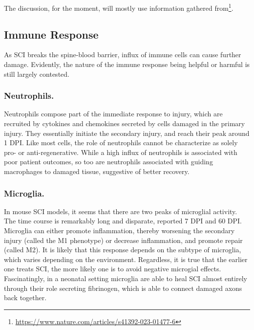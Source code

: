 \documentclass[12pt]{report}
\begin{document}
\label{sec:Cell-Specific-Responses}

The discussion, for the moment, will mostly use information gathered from\footnote{\url{https://www.nature.com/articles/s41392-023-01477-6}}.


\subsection{Immune Response}
As SCI breaks the spine-blood barrier, influx of immune cells can cause further damage. Evidently, the nature of the immune response being helpful or harmful is still largely contested.

\subsubsection{Neutrophils.}
Neutrophils compose part of the immediate response to injury, which are recruited by cytokines and chemokines secreted by cells damaged in the primary injury. They essentially initiate the secondary injury, and reach their peak around 1 DPI. Like most cells, the role of neutrophils cannot be characterize as solely pro- or anti-regenerative. While a high influx of neutrophils is associated with poor patient outcomes, so too are neutrophils associated with guiding macrophages to damaged tissue, suggestive of better recovery. 

\subsubsection{Microglia.}
In mouse SCI models, it seems that there are two peaks of microglial activity. The time course is remarkably long and disparate, reported 7 DPI and 60 DPI. Microglia can either promote inflammation, thereby worsening the secondary injury (called the M1 phenotype) or decrease inflammation, and promote repair (called M2). It is likely that this response depends on the subtype of microglia, which varies depending on the environment. Regardless, it is true that the earlier one treats SCI, the more likely one is to avoid negative microgial effects. Fascinatingly, in a neonatal setting microglia are able to heal SCI almost entirely through their role secreting fibrinogen, which is able to connect damaged axons back together. 
\end{document}
